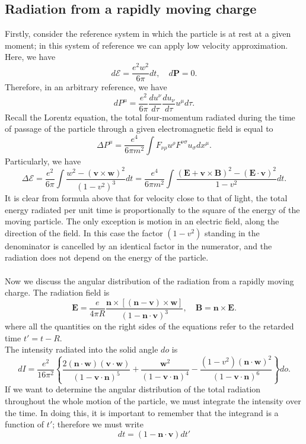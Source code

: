 \subsection{Radiation from a rapidly moving charge}
Firstly, consider the reference system in which the particle is at rest at a given moment; in this system of reference we can apply low velocity approximation. Here, we have
\[d\mathcal{E} = \frac{e^2 w^2}{6\pi}dt , \quad d\bm{P} = 0.\]
Therefore, in an arbitrary reference, we have
\[dP^{\mu} = \frac{e^2}{6\pi} \frac{du^{\nu}}{d\tau} \frac{du_{\nu}}{d\tau} u^{\mu}d\tau.\]
Recall the Lorentz equation, the total four-momentum radiated during the time of passage of the particle through a given electromagnetic field is equal to
\[\Delta P^{\mu} = \frac{e^4}{6\pi m^2} \int F_{\nu\rho}u^{\rho} F^{\nu\sigma}u_{\sigma} dx^{\mu}.\]
Particularly, we have
\[\Delta \mathcal{E} = \frac{e^2}{6\pi} \int \frac{w^2 - (\bm{v} \times \bm{w})^2}{(1-v^2)^3} dt = \frac{e^4}{6\pi m^2} \int \frac{(\bm{E} + \bm{v} \times \bm{B})^2-(\bm{E} \cdot \bm{v})^2}{1-v^2} dt.\]
It is clear from formula above that for velocity close to that of light, the total energy radiated per unit time is proportionally to the square of the energy of the moving particle. The only exception is motion in an electric field, along the direction of the field. In this case the factor $(1-v^2)$ standing in the denominator is cancelled by an identical factor in the numerator, and the radiation does not depend on the energy of the particle.
\\ \\
Now we discuss the angular distribution of the radiation from a rapidly moving charge. The radiation field is
\[\bm{E} = \frac{e}{4\pi R} \frac{\bm{n} \times \left[(\bm{n} - \bm{v}) \times \bm{w} \right]}{(1 - \bm{n} \cdot \bm{v})^3}  , \quad \bm{B} = \bm{n} \times \bm{E}.\]
where all the quantities on the right sides of the equations refer to the retarded time $t' = t - R$. \\
The intensity radiated into the solid angle $do$ is
\[dI = \frac{e^2}{16\pi^2} \left\{ \frac{2(\bm{n}\cdot\bm{w})(\bm{v}\cdot\bm{w})}{(1-\bm{v}\cdot\bm{n})^5} + \frac{\bm{w}^2}{(1-\bm{v}\cdot\bm{n})^4} - \frac{(1-v^2)(\bm{n}\cdot\bm{w})^2}{(1-\bm{v}\cdot\bm{n})^6}\right\}do.\]
If we want to determine the angular distribution of the total radiation throughout the whole motion of the particle, we must integrate the intensity over the time. In doing this, it
is important to remember that the integrand is a function of $t'$; therefore we must write
\[dt = (1-\bm{n}\cdot\bm{v})dt'\]
